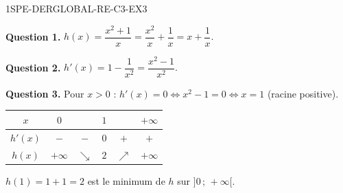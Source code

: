 \begin{corrige}{1SPE-DERGLOBAL-RE-C3-EX3}

\textbf{Question 1.}
$h(x) = \dfrac{x^2 + 1}{x} = \dfrac{x^2}{x} + \dfrac{1}{x} = x + \dfrac{1}{x}.$

\textbf{Question 2.}
$h'(x) = 1 - \dfrac{1}{x^2} = \dfrac{x^2 - 1}{x^2}.$


\textbf{Question 3.}
Pour $x > 0$ : $h'(x) = 0 \Leftrightarrow x^2 - 1 = 0 \Leftrightarrow x = 1$ (racine positive).

\begin{center}
\begin{tabular}{|c|ccccc|}
\hline
$x$ & $0$ & & $1$ & & $+\infty$ \\
\hline
$h'(x)$ & $-$ & $-$ & $0$ & $+$ & $+$ \\
\hline
$h(x)$ & $+\infty$ & $\searrow$ & $2$ & $\nearrow$ & $+\infty$ \\
\hline
\end{tabular}
\end{center}

$h(1) = 1 + 1 = 2$ est le minimum de $h$ sur $]0\,;\,+\infty[$.

\end{corrige}
